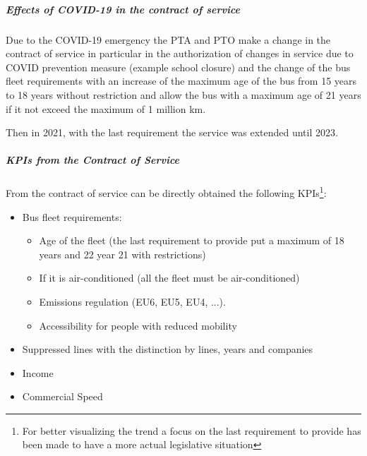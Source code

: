 \subparagraph{Effects of COVID-19 in the contract of service}
Due to the COVID-19 emergency the PTA and PTO make a change in the contract of service in particular in the authorization of changes in service due to COVID prevention measure (example school closure) and the change of the bus fleet requirements with an increase of the maximum age of the bus from 15 years to 18 years without restriction and allow the bus with a maximum age of 21 years if it not exceed the maximum of 1 million km.

Then in 2021, with the last requirement the service was extended until 2023.

\subparagraph{KPIs from the Contract of Service}
From the contract of service can be directly obtained the following KPIs\footnote{For better visualizing the trend a focus on the last requirement to provide has been made to have a more actual legislative situation}:
\begin{itemize}
    \item Bus fleet requirements:
    \begin{itemize}
        \item Age of the fleet (the last requirement to provide put a maximum of 18 years and 22 year 21 with restrictions)
        \item If it is air-conditioned (all the fleet must be air-conditioned)
        \item Emissions regulation (EU6, EU5, EU4, ...).
        \item Accessibility for people with reduced mobility
    \end{itemize}
    \item Suppressed lines with the distinction by lines, years and companies
    \item Income
    \item Commercial Speed
\end{itemize}
